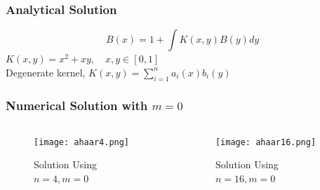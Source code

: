 \begin{frame}\frametitle{Analytical Solution}
\begin{equation}
  B(x)=1+\int K(x,y)B(y)dy
\end{equation}
\centering
$  K(x,y)=x^2+xy, \quad x,y \in [0,1]$\\
\centering
Degenerate kernel, $K(x,y) = \sum\limits_{i=1}^na_i(x)b_i(y) $
 
%
%
\end{frame}

\begin{frame}\frametitle{Numerical Solution with $m = 0$}
 \begin{columns}[T]
         \begin{column}{.5\textwidth}

              \begin{figure}
              \centering
              \texttt{[image: ahaar4.png]}
              \caption{Solution Using \\ $n=4,m=0$}
              \label{fig_e_vs_n_f1}
              \end{figure}
        \end{column}
         \begin{column}{.5\textwidth}

              \begin{figure}
              \centering
              \texttt{[image: ahaar16.png]}
              \caption{Solution Using \\ $n=16,m=0$}
              \label{fig_e_vs_n_f2}
              \end{figure}
        \end{column}
        \end{columns}

\end{frame}



